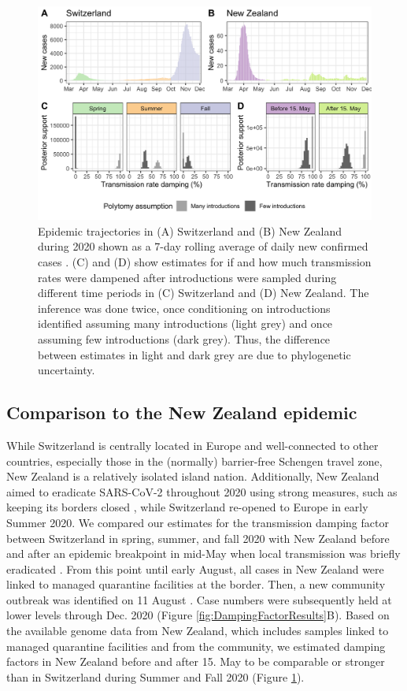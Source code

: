 \documentclass[11pt,twoside,lineno]{pnas-new} %
\begin{document}
\begin{figure}[h!]
\centering
\includegraphics[width=0.75\linewidth]{figures/contact_tracing_factors_no_sampUB_compared_to_cases.png}
\caption{Epidemic trajectories in (A) Switzerland and (B) New Zealand during 2020 shown as a 7-day rolling average of daily new confirmed cases \cite{Appel}. (C) and (D) show estimates for if and how much transmission rates were dampened after introductions were sampled during different time periods in (C) Switzerland and (D) New Zealand. The inference was done twice, once conditioning on introductions identified assuming many introductions (light grey) and once assuming few introductions (dark grey). Thus, the difference between estimates in light and dark grey are due to phylogenetic uncertainty.}  
\label{fig:scale-factor}
\end{figure}

\subsection{Comparison to the New Zealand epidemic}
While Switzerland is centrally located in Europe and well-connected to other countries, especially those in the (normally) barrier-free Schengen travel zone, New Zealand is a relatively isolated island nation. Additionally, New Zealand aimed to eradicate SARS-CoV-2 throughout 2020 using strong measures, such as keeping its borders closed \cite{ZL-covid-policies}, while Switzerland re-opened to Europe in early Summer 2020. We compared our estimates for the transmission damping factor between Switzerland in spring, summer, and fall 2020 with New Zealand before and after an epidemic breakpoint in mid-May when local transmission was briefly eradicated \cite{Geoghegan2020}. From this point until early August, all cases in New Zealand were linked to managed quarantine facilities at the border. Then, a new community outbreak was identified on 11 August \cite{Geoghegan2021-nzl-outbreak}. Case numbers were subsequently held at lower levels through Dec. 2020 (Figure \ref{fig:DampingFactorResults}B). Based on the available genome data from New Zealand, which includes samples linked to managed quarantine facilities and from the community, we estimated damping factors in New Zealand before and after 15. May to be comparable or stronger than in Switzerland during Summer and Fall 2020 (Figure \ref{fig:scale-factor}).
\end{document}
